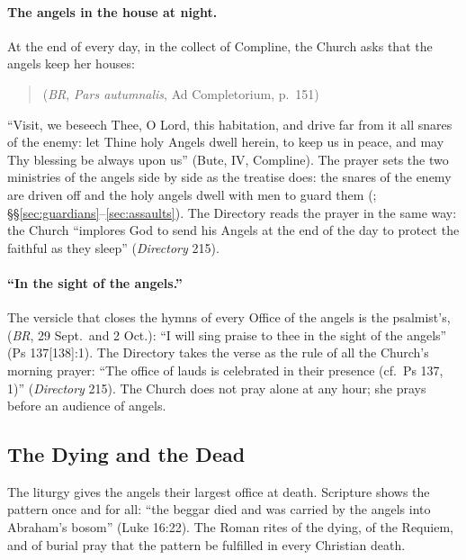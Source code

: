\paragraph{The angels in the house at night.} At the end of every day,
in the collect of Compline, the Church asks that the angels keep her
houses:
\begin{quote}
(\emph{BR}, \emph{Pars autumnalis}, Ad Completorium, p.~151)
\end{quote}
``Visit, we beseech Thee, O Lord, this habitation, and drive far from it
all snares of the enemy: let Thine holy Angels dwell herein, to keep us in
peace, and may Thy blessing be always upon us'' (Bute, IV, Compline). The
prayer sets the two ministries of the angels side by side as the treatise
does: the snares of the enemy are driven off and the holy angels dwell
with men to guard them (; \S\S\ref{sec:guardians}--\ref{sec:assaults}). The Directory reads the prayer in the same way: the
Church ``implores God to send his Angels at the end of the day to protect
the faithful as they sleep'' (\emph{Directory} 215).

\paragraph{``In the sight of the angels.''} The versicle that closes the
hymns of every Office of the angels is the psalmist's,  (\emph{BR}, 29 Sept.\ and 2 Oct.): ``I will sing
praise to thee in the sight of the angels'' (Ps 137[138]:1). The Directory
takes the verse as the rule of all the Church's morning prayer: ``The
office of lauds is celebrated in their presence (cf.\ Ps 137,\,1)''
(\emph{Directory} 215). The Church does not pray alone at any hour; she
prays before an audience of angels.

\sectionguard
\subsection{The Dying and the Dead}

The liturgy gives the angels their largest office at death. Scripture
shows the pattern once and for all: ``the beggar died and was carried by
the angels into Abraham's bosom'' (Luke 16:22). The Roman rites of the
dying, of the Requiem, and of burial pray that the pattern be fulfilled in
every Christian death.

